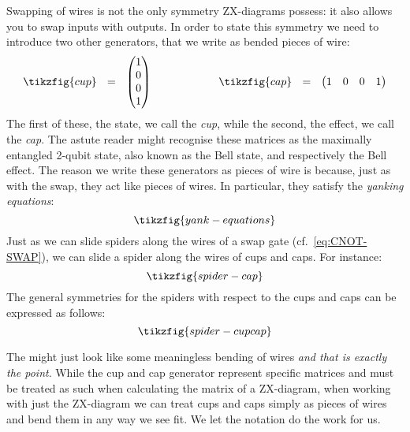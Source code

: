 \documentclass[a4paper,onecolumn,superscriptaddress,11pt,%
				unpublished,%
				allowfontchageintitle,%
				]{quantumarticle}
\begin{document}
Swapping of wires is not the only symmetry ZX-diagrams possess: it also allows you to swap inputs with outputs. In order to state this symmetry we need to introduce two other generators, that we write as bended pieces of wire:
\begin{equation}\label{eq:cup-cap-def}
	\tikzfig{cup} \ \ =\  \ \begin{pmatrix}1\\0\\0\\1\end{pmatrix} \qquad \qquad \qquad\tikzfig{cap} \ \ =\ \ \begin{pmatrix}1&0&0&1\end{pmatrix}
\end{equation}
The first of these, the state, we call the \emph{cup}, while the second, the effect, we call the \emph{cap}. The astute reader might recognise these matrices as the maximally entangled 2-qubit state, also known as the Bell state, and respectively the Bell effect.
The reason we write these generators as pieces of wire is because, just as with the swap, they act like pieces of wires. In particular, they satisfy the \emph{yanking equations}:
\begin{equation}\label{eq:yank-equations}
\tikzfig{yank-equations}
\end{equation}
Just as we can slide spiders along the wires of a swap gate (cf.~\eqref{eq:CNOT-SWAP}), we can slide a spider along the wires of cups and caps. For instance:
\begin{equation}
\tikzfig{spider-cap}
\end{equation}
The general symmetries for the spiders with respect to the cups and caps can be expressed as follows:
\begin{equation}\label{eq:spider-cupcap}
\tikzfig{spider-cupcap}
\end{equation}

The might just look like some meaningless bending of wires \emph{and that is exactly the point}. 
While the cup and cap generator represent specific matrices and must be treated as such when calculating the matrix of a ZX-diagram, when working with just the ZX-diagram we can treat cups and caps simply as pieces of wires and bend them in any way we see fit. We let the notation do the work for us.
\end{document}
